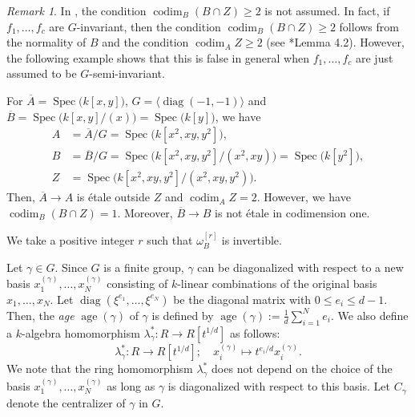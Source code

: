 \documentclass[a4paper,11pt]{amsart}
\theoremstyle{definition}
\theoremstyle{remark}
\newtheorem{rmk}[thm]{Remark}
\begin{document}
\begin{rmk}\label{rmk:codim 2}
In \cite{NS22}, the condition $\operatorname{codim} _B (B \cap Z) \ge 2$ is not assumed. 
In fact, if $f_1, \ldots, f_c$ are $G$-invariant, 
then the condition $\operatorname{codim} _B (B \cap Z) \ge 2$ follows from
the normality of $B$ and the condition $\operatorname{codim} _A  Z \ge 2$ (see \cite{NS22}*{Lemma 4.2}). 
However, the following example shows that this is false in general 
when $f_1, \ldots, f_c$ are just assumed to be $G$-semi-invariant.

For $\overline{A}=\operatorname{Spec} \bigl( k[x,y] \bigr)$, 
$G=\langle\operatorname{diag}(-1,-1)\rangle$ and 
$\overline{B}=\operatorname{Spec} \bigl( k[x,y]/(x) \bigr)=\operatorname{Spec} \bigl( k[y] \bigr)$, we have
\begin{align*}
A&=\overline{A}/G=\operatorname{Spec} \bigl( k[x^2,xy,y^2] \bigr),\\
B&=\overline{B}/G=\operatorname{Spec} \bigl( k[x^2,xy,y^2]/(x^2, xy) \bigr)=\operatorname{Spec} \bigl( k[y^2] \bigr), \\
Z&=\operatorname{Spec} \bigl( k[x^2,xy,y^2] /(x^2,xy,y^2)\bigr).
\end{align*}
Then, $\overline{A} \to A$ is \'{e}tale outside $Z$ and $\operatorname{codim}_A Z = 2$.
However, we have $\operatorname{codim} _B (B \cap Z) =1$.
Moreover, $\overline{B} \to B$ is not \'{e}tale in codimension one.
\end{rmk}
We take a positive integer $r$ such that $\omega _{B}^{[r]}$ is invertible. 


Let $\gamma \in G$. 
Since $G$ is a finite group, $\gamma$ can be diagonalized with respect to a new basis $x_1^{(\gamma)}, \ldots, x_N^{(\gamma)}$ consisting of $k$-linear combinations of the original basis $x_1, \ldots , x_N$.
Let $\operatorname{diag} \left( \xi ^{e_1}, \ldots , \xi ^{e_N} \right)$ be the diagonal matrix 
with $0 \le e_i \le d-1$. 
Then, the \textit{age} $\operatorname{age}(\gamma)$ of $\gamma$ is defined by $\operatorname{age}(\gamma) := \frac{1}{d} \sum _{i = 1} ^N e_i$. 
We also define a $k$-algebra homomorphism ${\lambda}^* _{\gamma}:R \to R[t^{1/d}]$ as follows:
\[
{\lambda}^* _{\gamma}: R \to R[t^{1/d}]; 
\quad x_i^{(\gamma)} \mapsto t^{e_i/d}x_i^{(\gamma)}. 
\]
We note that the ring homomorphism ${\lambda}^* _{\gamma}$ does not depend on the choice of the basis $x_1^{(\gamma)}, \ldots, x_N^{(\gamma)}$ as long as $\gamma$ is diagonalized with respect to this basis. 
Let $C_{\gamma}$ denote the centralizer of $\gamma$ in $G$. 
\end{document}
